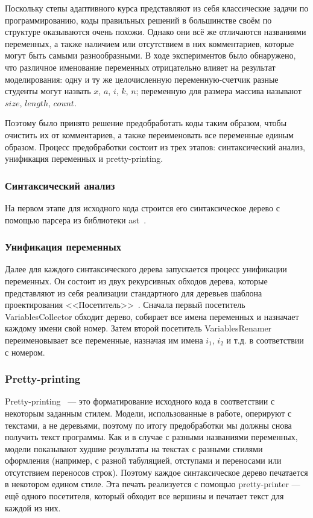 \documentclass[14pt]{matmex-diploma-custom}
\begin{document}
Поскольку степы адаптивного курса представляют из себя классические задачи по программированию, коды правильных решений в большинстве своём по структуре оказываются очень похожи. Однако они всё же отличаются названиями переменных, а также наличием или отсутствием в них комментариев, которые могут быть самыми разнообразными. В ходе экспериментов было обнаружено, что различное именование переменных отрицательно влияет на результат моделирования: одну и ту же целочисленную переменную-счетчик разные студенты могут назвать $x$, $a$, $i$, $k$, $n$; переменную для размера массива называют $size$, $length$, $count$.

Поэтому было принято решение предобработать коды таким образом, чтобы очистить их от комментариев, а также переименовать все переменные единым образом. Процесс предобработки состоит из трех этапов: синтаксический анализ, унификация переменных и pretty-printing.

\subsubsection*{Синтаксический анализ}
На первом этапе для исходного кода строится его синтаксическое дерево с помощью парсера из библиотеки ast~\cite{ast}.

\subsubsection*{Унификация переменных}
Далее для каждого синтаксического дерева запускается процесс унификации переменных. Он состоит из двух рекурсивных обходов дерева, которые представляют из себя реализации стандартного для деревьев шаблона проектирования <<Посетитель>>~\cite{DesignPatterns}. Сначала первый посетитель VariablesCollector обходит дерево, собирает все имена переменных и назначает каждому имени свой номер. Затем второй посетитель VariablesRenamer переименовывает все переменные, назначая им имена $i_1$, $i_2$ и т.д. в соответствии с номером.

\subsubsection*{Pretty-printing}
Pretty-printing~\cite{pretty-printing} --- это форматирование исходного кода в соответствии с некоторым заданным стилем. Модели, использованные в работе, оперируют с текстами, а не деревьями, поэтому по итогу предобработки мы должны снова получить текст программы. Как и в случае с разными названиями переменных, модели показывают худшие результаты на текстах с разными стилями оформления (например, с разной табуляцией, отступами и переносами или отсутствием переносов строк). Поэтому каждое синтаксическое дерево печатается в некотором едином стиле. Эта печать реализуется с помощью pretty-printer --- ещё одного посетителя, который обходит все вершины и печатает текст для каждой из них.
\end{document}
